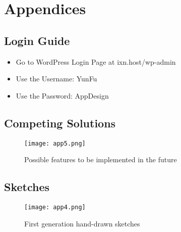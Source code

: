 \documentclass[fontsize=11pt]{extarticle}
\numberwithin{figure}{section} %
\begin{document}
\printbibliography


\newpage
\section{Appendices}

\subsection{Login Guide}
\begin{itemize}

  \item Go to WordPress Login Page at ixn.host/wp-admin
  \item Use the Username: YunFu
  \item Use the Password: AppDesign

\end{itemize}

\begin{landscape}
\subsection{Competing Solutions}
  \begin{figure}[H]
      \centering
      \texttt{[image: app5.png]}
      \caption{Possible features to be implemented in the future}
 \end{figure}
 \end{landscape}

 \newpage


\begin{landscape}
\subsection{Sketches}
 \begin{figure}[H]
      \centering
      \texttt{[image: app4.png]}
      \caption{First generation hand-drawn sketches}
 \end{figure}
\end{landscape}

 \newpage
\end{document}
